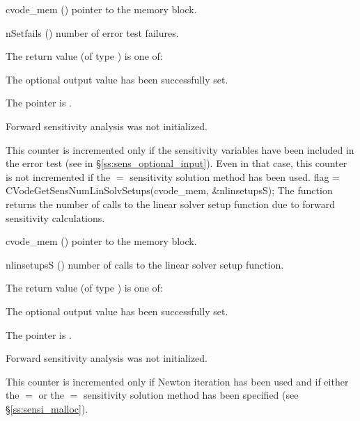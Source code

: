 {
  \begin{args}
  \item[cvode\_mem] ()
    pointer to the {\cvodes} memory block.
  \item[nSetfails] ()
    number of error test failures.
  \end{args}
}
{
  The return value  (of type ) is one of:
  \begin{args}
  \item[\Id{CV\_SUCCESS}] 
    The optional output value has been successfully set.
  \item[\Id{CV\_MEM\_NULL}]
    The  pointer is .
  \item[\Id{CV\_NO\_SENS}]
    Forward sensitivity analysis was not initialized.
  \end{args}
}
{
  This counter is incremented only if the sensitivity variables have been included
  in the error test (see  in \S\ref{ss:sens_optional_input}). 
  Even in that case, this counter is not incremented if the $=$ 
  sensitivity solution method has been used.
}
{
  flag = CVodeGetSensNumLinSolvSetups(cvode\_mem, \&nlinsetupsS);
}
{
  The function  returns the number of calls
  to the linear solver setup function due to forward sensitivity calculations.
}
{
  \begin{args}
  \item[cvode\_mem] ()
    pointer to the {\cvodes} memory block.
  \item[nlinsetupsS] ()
    number of calls to the linear solver setup function.
  \end{args}
}
{
  The return value  (of type ) is one of:
  \begin{args}
  \item[\Id{CV\_SUCCESS}] 
    The optional output value has been successfully set.
  \item[\Id{CV\_MEM\_NULL}]
    The  pointer is .
  \item[\Id{CV\_NO\_SENS}]
    Forward sensitivity analysis was not initialized.
  \end{args}
}
{
  This counter is incremented only if Newton iteration has been used and if
  either the  $=$  or the  $=$ 
  sensitivity solution method has been specified (see \S\ref{ss:sensi_malloc}).
}
